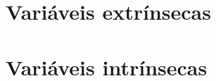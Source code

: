 \begin{comment}
\section{Introdução histórica}

No século 16, acreditava-se que as estrelas eram fixas em posição e com brilho constante. Em 1572, foi observada uma supernova na constelação de Cassiopeia que atingiu magnitude $-4$. Este evento, que foi estudado por Tycho Brahe (1546-1601), fez com que a comunidade astronômica da época voltasse a se interessar pela descobertas de novas estrelas. Alguns anos mais tarde, em 1596, o holandês David Fabricius (1564-1617) fez o primeiro registro de variação em brilho de uma estrela na constelação da Baleia (Cetus).  Essa estrela foi observada em agosto e em outubro havia desaparecido. Em 1603, Johann Bayer observou a mesma estrela e deu o nome de omicron ($O$) Ceti, porém não sabia que era a mesma estrela que Fabricius havia observado, pois achava que se tratava de uma supernova. Em 1638, Johannes Holwarda (1618-1651) observou novamente $O$ Ceti. Em 1662, Johannes Hevelius (1611-1687) fez um estudo detalhado da estrela e a renomeou, a chamando de Mira Ceti (a Maravilhosa). Ismael Bullialdus (1605-1694) percebeu que o pico de magnitude da estrela ocorria sempre um mês mais cedo a cada ano, descobrindo a natureza cíclica de sua variação de brilho. Bullialdus publicou em 1967 que o período de oscilação era de 333 dias. Esta estrela foi a primeira variável a ter o período conhecido e virou referência para as estrelas variáveis de períodos longos, conhecidas hoje em dia como as \textit{variáveis Mira}.

Em 1784, o inglês Jonh Goodricke (1764-1786) descobriu a variação no brilho da estrela $\delta$ Cephei. Ele mediu o período $5\si{\day}8\si{\hour}$. No mesmo ano, o inglês Edward Pigott (1753-1825) descobriu a variabilidade de $\eta$ Aquilae. Ambas essas estrelas se tornaram os protótipos da classe de \textit{variáveis Cefeidas}.

Em 1912, a americana Henrietta Swan Leavitt (1868-1921), derivou uma relação entre o período e a luminosidade (também conhecida como lei de Leavitt) para as estrelas Cefeidas localizadas na Pequena Nuvem de Magalhães \citep{Leavitt1912}. Graças a esta relação que em 1913 Hertzsprung foi capaz de calcular a primeira determinação de distância da Pequena Nuvem \citep{Hertzsprung1913}. Também, utilizando a mesma relação, Hubble determinou a distância de Andrômeda em 1923.

\end{comment}

\section{Variáveis extrínsecas}


\section{Variáveis intrínsecas}